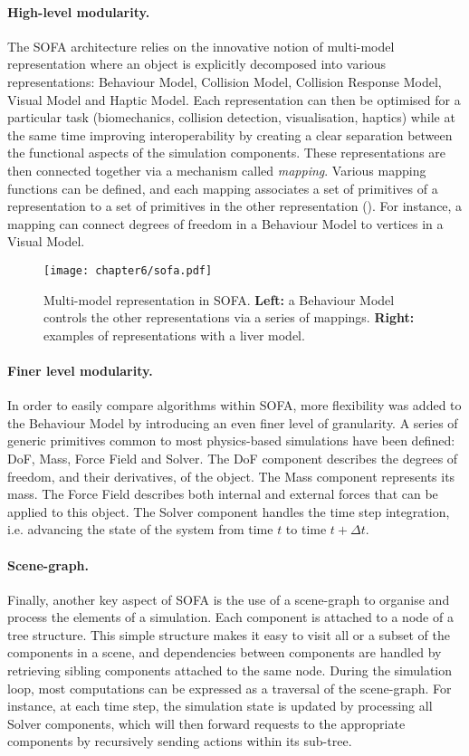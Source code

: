 \paragraph{High-level modularity.}
The SOFA architecture relies on the innovative notion of multi-model representation where an object is explicitly decomposed into various representations: Behaviour Model, Collision Model, Collision Response Model, Visual Model and Haptic Model. Each representation can then be optimised for a particular task (biomechanics,  collision detection, visualisation, haptics) while at the same time improving interoperability by creating a clear separation between the functional aspects of the simulation components. These representations are then connected together via a mechanism called \emph{mapping}. Various mapping functions can be defined, and each mapping associates a set of primitives of a representation to a set of primitives in the other representation (). For instance, a mapping can connect degrees of freedom in a Behaviour Model to vertices in a Visual Model.

\begin{figure}
\texttt{[image: chapter6/sofa.pdf]}
\caption [Multi-model representation in SOFA] {Multi-model representation in SOFA. \textbf{Left:} a Behaviour Model controls the other representations via a series of mappings. \textbf{Right:} examples of representations with a liver model.}
\label{chap6:fig-SOFA}
\end{figure}

\paragraph{Finer level modularity.}
In order to easily compare algorithms within SOFA, more flexibility was added to the Behaviour Model by introducing an even finer level of granularity. A series of generic primitives common to most physics-based simulations have been defined: DoF, Mass, Force Field and Solver. The DoF component describes the degrees of freedom, and their derivatives, of the object. The Mass component represents its mass. The Force Field describes both internal and external forces that can be applied to this object. The Solver component handles the time step integration, i.e. advancing the state of the system from time $t$ to time $t+\Delta t$.

\paragraph{Scene-graph.}
Finally, another key aspect of SOFA is the use of a scene-graph to organise and process the elements of a simulation. Each component is attached to a node of a tree structure. This simple structure makes it easy to visit all or a subset of the components in a scene, and dependencies between components are handled by retrieving sibling components attached to the same node. 
During the simulation loop, most computations can be expressed as a traversal of the scene-graph. For instance, at each time step, the simulation state is updated by processing all Solver components, which will then forward requests to the appropriate components by recursively sending actions within its sub-tree.

